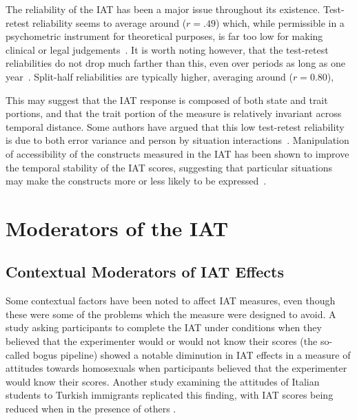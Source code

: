 The reliability of the IAT has been a major issue throughout its existence. Test-retest reliability seems to average around ($r=.49$) which, while permissible in a psychometric instrument for theoretical purposes, is far too low for making clinical or legal judgements~\cite{Greenwald2000, Blanton2006d}. It is worth noting however, that the test-retest reliabilities do not drop much farther than this, even over periods as long as one year~\cite{Egloff2005}. 
Split-half reliabilities are typically higher, averaging around ($r=0.80$),  

This may suggest that the IAT response is composed of both state and trait portions, and that the trait portion of the measure is relatively invariant across temporal distance. Some authors have argued that this low test-retest reliability is due to both error variance and person by situation interactions~\cite{Gschwendner2008}.  Manipulation of accessibility of the constructs measured in the IAT has been shown to improve the temporal stability of the IAT scores, suggesting that particular situations may make the constructs more or less likely to be expressed~\cite{Gschwendner2008}. 





\section{Moderators of the IAT}
\label{sec:moderators-iat}



\subsection{Contextual Moderators of IAT Effects}
\label{sec:cont-moder-iat}



Some contextual factors have been noted to affect IAT measures, even though these were some of the problems which the measure were designed to avoid. A study asking participants to complete the IAT under conditions when they believed that the experimenter would or would not know their scores (the so-called bogus pipeline) \cite{Boysen2006} showed a notable diminution in IAT effects in a measure of attitudes towards homosexuals when participants believed that the experimenter would know their scores. %
Another study examining the attitudes of Italian students to Turkish immigrants replicated this finding, with IAT scores being reduced when in the presence of others \cite{Castelli2008}. 

